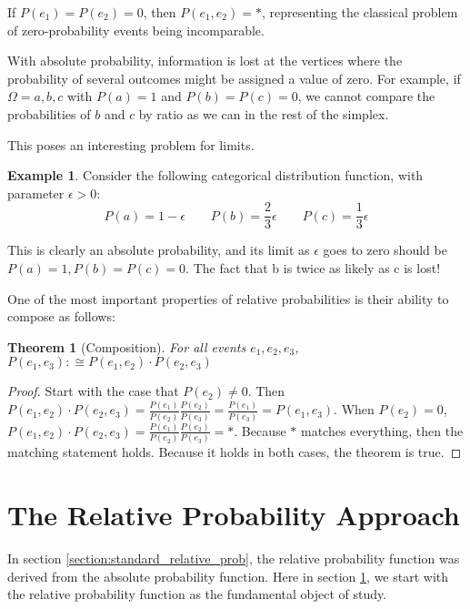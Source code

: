 \documentclass[twoside]{article}
\theoremstyle{plain}%
\newtheorem{theorem}{Theorem}[section]
\theoremstyle{definition}
\newtheorem{example}{Example}[section]
\theoremstyle{remark}
\begin{document}
If \(P(e_1) = P(e_2) = 0\), then \(P(e_1, e_2) = \ast\), representing the classical problem of zero-probability events being incomparable.

With absolute probability, information is lost at the vertices where the probability of several outcomes might be assigned a value of zero. For example, if \(\Omega = {a, b, c}\) with \(P(a) = 1\) and \(P(b) = P(c) = 0\), we cannot compare the probabilities of \(b\) and \(c\) by ratio as we can in the rest of the simplex.

This poses an interesting problem for limits.

\begin{example}
\label{ex:abs_lose_info}
Consider the following categorical distribution function, with parameter \(\epsilon > 0\):
\[
P(a) = 1 - \epsilon\qquad
P(b) = \frac{2}{3}\epsilon\qquad
P(c) = \frac{1}{3}\epsilon
\]
\end{example}

This is clearly an absolute probability, and its limit as \(\epsilon\) goes to zero should be \(P(a) = 1, P(b) = P(c) = 0\). The fact that b is twice as likely as c is lost!

One of the most important properties of relative probabilities is their ability to compose as follows:

\begin{theorem}[Composition]
\label{thm:abs_composition}
For all events \(e_1, e_2, e_3\), \(P(e_1, e_3) :\cong P(e_1, e_2) \cdot P(e_2, e_3)\)
\end{theorem}

\begin{proof}
Start with the case that \(P(e_2)\neq 0\). Then \(P(e_1, e_2) \cdot P(e_2, e_3) = \frac{P(e_1)}{P(e_2)}\frac{P(e_2)}{P(e_3)} = \frac{P(e_1)}{P(e_3)} = P(e_1, e_3)\). When \(P(e_2) = 0\), \(P(e_1, e_2) \cdot P(e_2, e_3) = \frac{P(e_1)}{P(e_2)}\frac{P(e_2)}{P(e_3)} = \ast\). Because \(\ast\) matches everything, then the matching statement holds. Because it holds in both cases, the theorem is true.
\end{proof}

\section{The Relative Probability Approach}
\label{section:new_relative_prob}

In section \ref{section:standard_relative_prob}, the relative probability function was derived from the absolute probability function. Here in section \ref{section:new_relative_prob}, we start with the relative probability function as the fundamental object of study.
\end{document}
